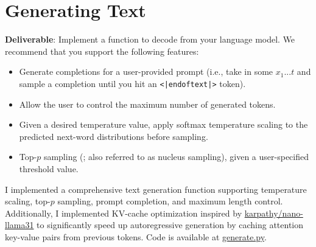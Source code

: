 \section{Generating Text}


\textbf{Deliverable}: Implement a function to decode from your language model. We recommend that you support the following features:

\begin{itemize}
    \item Generate completions for a user-provided prompt (i.e., take in some $x_1...t$ and sample a completion until you hit an \lstinline{<|endoftext|>} token).
    \item Allow the user to control the maximum number of generated tokens.
    \item Given a desired temperature value, apply softmax temperature scaling to the predicted next-word distributions before sampling.
    \item Top-$p$ sampling (\citet{holtzman2019curious}; also referred to as nucleus sampling), given a user-specified threshold value.
\end{itemize}

\begin{answer}
I implemented a comprehensive text generation function supporting temperature scaling, top-$p$ sampling, prompt completion, and maximum length control. Additionally, I implemented KV-cache optimization inspired by \href{https://github.com/karpathy/nano-llama31/blob/master/llama31.py}{karpathy/nano-llama31} to significantly speed up autoregressive generation by caching attention key-value pairs from previous tokens. 
Code is available at \href{https://github.com/donglinkang2021/assignment1-basics/blob/main/cs336_basics/generate.py}{generate.py}.
\end{answer}